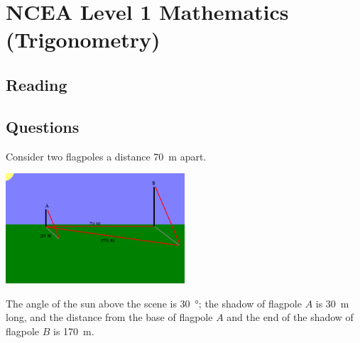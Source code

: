 \documentclass{exam}
\begin{document}
\section*{NCEA Level 1 Mathematics (Trigonometry)}

\subsection*{Reading}
\subsection*{Questions}
\begin{questions}

\question Consider two flagpoles a distance \SI{70}{\metre} apart.
          \begin{center}
            \includegraphics[width=0.5\textwidth]{flagpoles}
          \end{center}
          The angle of the sun above the scene is \SI{30}{\degree}; the shadow of flagpole $ A $ is \SI{30}{\metre} long, and
          the distance from the base of flagpole $ A $ and the end of the shadow of flagpole $ B $ is \SI{170}{\metre}.
  

\end{questions}
\end{document}
